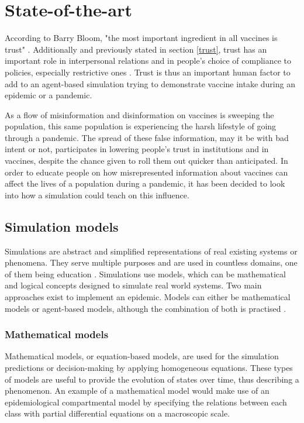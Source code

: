 \chapter{State-of-the-art}

According to Barry Bloom, "the most important ingredient in all vaccines is trust" \cite{pilichowski2021enhancing, writer_build_trust_covid_vaccine_2020}. Additionally and previously stated in section \ref{trust}, trust has an important role in interpersonal relations and in people's choice of compliance to policies, especially restrictive ones \cite{devine_trust_2021}.
Trust is thus an important human factor to add to an agent-based simulation trying to demonstrate vaccine intake during an epidemic or a pandemic.

As a flow of misinformation and disinformation on vaccines is sweeping the population, this same population is experiencing the harsh lifestyle of going through a pandemic. The spread of these false information, may it be with bad intent or not, participates in lowering people's trust in institutions and in vaccines, despite the chance given to roll them out quicker than anticipated.
In order to educate people on how misrepresented information about vaccines can affect the lives of a population during a pandemic, it has been decided to look into how a simulation could teach on this influence.



\section{Simulation models}

Simulations are abstract and simplified representations of real existing systems or phenomena. They serve multiple purposes and are used in countless domains, one of them being education \cite{axelrod_advancing_1997}. Simulations use models, which can be mathematical and logical concepts designed to simulate real world systems. Two main approaches exist to implement an epidemic. Models can either be mathematical models or agent-based models, although the combination of both is practised \cite{bobashev_hybrid_2007}.

\subsection{Mathematical models}
\label{mathematical_models}

Mathematical models, or equation-based models, are used for the simulation predictions or decision-making by applying homogeneous equations. These types of models are useful to provide the evolution of states over time, thus describing a phenomenon.
An example of a mathematical model would make use of an epidemiological compartmental model by specifying the relations between each class with partial differential equations on a macroscopic scale.

